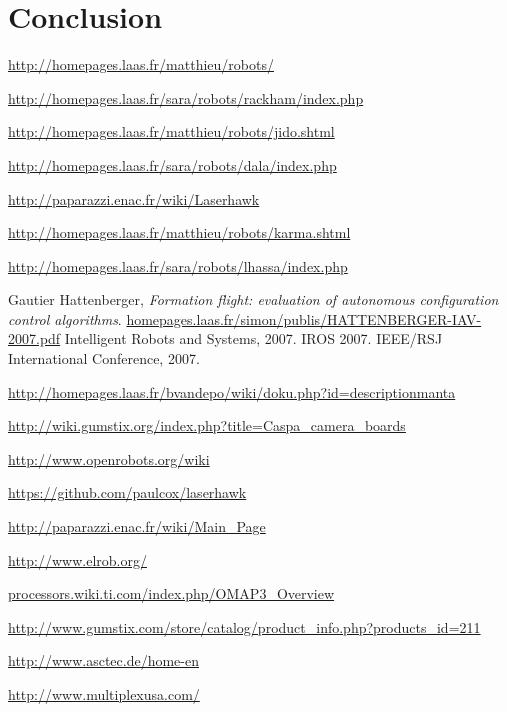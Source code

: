 \documentclass[a4paper,11pt]{report}
\begin{document}
\chapter{Conclusion}



\begin{thebibliography}{9}

  \url{http://homepages.laas.fr/matthieu/robots/}


  \url{http://homepages.laas.fr/sara/robots/rackham/index.php}

  \url{http://homepages.laas.fr/matthieu/robots/jido.shtml}

  \url{http://homepages.laas.fr/sara/robots/dala/index.php}

  \url{http://paparazzi.enac.fr/wiki/Laserhawk}

  \url{http://homepages.laas.fr/matthieu/robots/karma.shtml}

  \url{http://homepages.laas.fr/sara/robots/lhassa/index.php}

  Gautier Hattenberger,
  \emph{Formation flight: evaluation of autonomous configuration control algorithms}.
  \url{homepages.laas.fr/simon/publis/HATTENBERGER-IAV-2007.pdf}
  Intelligent Robots and Systems, 2007. IROS 2007. IEEE/RSJ International Conference, 
  2007.

  \url{http://homepages.laas.fr/bvandepo/wiki/doku.php?id=descriptionmanta}

  \url{http://wiki.gumstix.org/index.php?title=Caspa_camera_boards}

  \url{http://www.openrobots.org/wiki}

  \url{https://github.com/paulcox/laserhawk}

  \url{http://paparazzi.enac.fr/wiki/Main_Page}

  \url{http://www.elrob.org/}

  \url{processors.wiki.ti.com/index.php/OMAP3_Overview}

  \url{http://www.gumstix.com/store/catalog/product_info.php?products_id=211}

  \url{http://www.asctec.de/home-en}

  \url{http://www.multiplexusa.com/}


\end{thebibliography}
\end{document}
